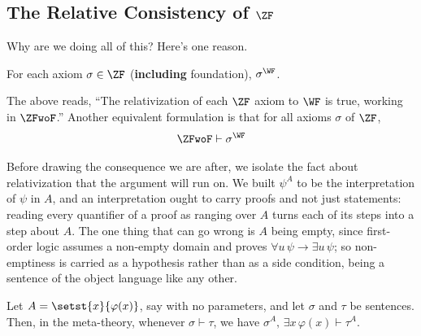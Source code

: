 \subsection{The Relative Consistency of $\ZF$}

Why are we doing all of this? Here's one reason.

\begin{boxtheorem} \label{Ch2:Thm:ZF_Relativizes_To_WF}
    For each axiom $\sigma \in \ZF$ (\textbf{including} foundation), $\sigma^{\WF}$.
\end{boxtheorem}
The above reads, ``The relativization of each $\ZF$ axiom to $\WF$ is true, working in $\ZFwoF$.'' Another equivalent formulation is that for all axioms $\sigma$ of $\ZF$,
\begin{align}
    \ZFwoF \vdash \sigma^{\WF}
\end{align}

Before drawing the consequence we are after, we isolate the fact about relativization that the argument will run on. We built $\psi^A$ to be the interpretation of $\psi$ in $A$, and an interpretation ought to carry proofs and not just statements: reading every quantifier of a proof as ranging over $A$ turns each of its steps into a step about $A$. The one thing that can go wrong is $A$ being empty, since first-order logic assumes a non-empty domain and proves $\forall u \, \psi \to \exists u \, \psi$; so non-emptiness is carried as a hypothesis rather than as a side condition, being a sentence of the object language like any other.

\begin{boxlemma}[Scheme] \label{Ch2:Lemma:Relativization_Preserves_Proofs}
    Let $A = \setst{x}{\varphi(x)}$, say with no parameters, and let $\sigma$ and $\tau$ be sentences. Then, in the meta-theory, whenever $\sigma \vdash \tau$, we have $\sigma^A, \, \exists x \, \varphi(x) \vdash \tau^A$.
\end{boxlemma}

